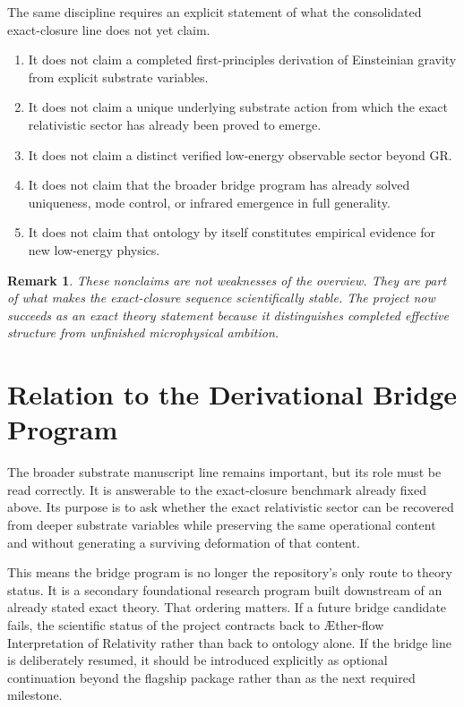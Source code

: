 \documentclass[11pt]{article}
\newcommand{\Aflow}{\AE{}ther-flow}
\newcommand{\TheoryName}{\Aflow{} Interpretation of Relativity}
\newtheorem{remark}{Remark}
\begin{document}
The same discipline requires an explicit statement of what the consolidated exact-closure line does not yet claim.
\begin{enumerate}
    \item It does not claim a completed first-principles derivation of Einsteinian gravity from explicit substrate variables.
    \item It does not claim a unique underlying substrate action from which the exact relativistic sector has already been proved to emerge.
    \item It does not claim a distinct verified low-energy observable sector beyond GR.
    \item It does not claim that the broader bridge program has already solved uniqueness, mode control, or infrared emergence in full generality.
    \item It does not claim that ontology by itself constitutes empirical evidence for new low-energy physics.
\end{enumerate}

\begin{remark}
These nonclaims are not weaknesses of the overview. They are part of what makes the exact-closure sequence scientifically stable. The project now succeeds as an exact theory statement because it distinguishes completed effective structure from unfinished microphysical ambition.
\end{remark}

\section{Relation to the Derivational Bridge Program}

The broader substrate manuscript line remains important, but its role must be read correctly. It is answerable to the exact-closure benchmark already fixed above. Its purpose is to ask whether the exact relativistic sector can be recovered from deeper substrate variables while preserving the same operational content and without generating a surviving deformation of that content.

This means the bridge program is no longer the repository's only route to theory status. It is a secondary foundational research program built downstream of an already stated exact theory. That ordering matters. If a future bridge candidate fails, the scientific status of the project contracts back to \TheoryName{} rather than back to ontology alone. If the bridge line is deliberately resumed, it should be introduced explicitly as optional continuation beyond the flagship package rather than as the next required milestone.
\end{document}
